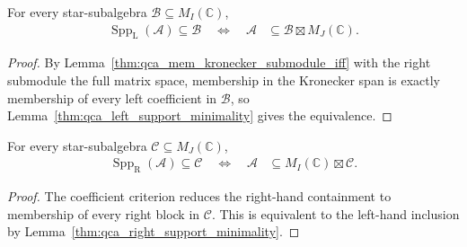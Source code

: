 \begin{lemma}
    \label{thm:qca_left_support_tensor_submodule}
    \leanok
    For every star-subalgebra $\mathcal B\subseteq M_I(\mathbb C)$,
    \begin{align}
        \operatorname{Spp}_{\mathrm L}(\mathcal A)\subseteq\mathcal B
        \quad\Longleftrightarrow\quad
        \mathcal A & \subseteq
        \mathcal B\boxtimes M_J(\mathbb C).
    \end{align}
\end{lemma}

\begin{proof}\leanok
    By Lemma~\ref{thm:qca_mem_kronecker_submodule_iff} with the right
    submodule the full matrix space, membership in the Kronecker span is
    exactly membership of every left coefficient in $\mathcal B$, so
    Lemma~\ref{thm:qca_left_support_minimality} gives the equivalence.
\end{proof}

\begin{lemma}
    \label{thm:qca_right_support_kronecker_submodule}
    \leanok
    For every star-subalgebra $\mathcal C\subseteq M_J(\mathbb C)$,
    \begin{align}
        \operatorname{Spp}_{\mathrm R}(\mathcal A)\subseteq\mathcal C
        \quad\Longleftrightarrow\quad
        \mathcal A & \subseteq M_I(\mathbb C)\boxtimes\mathcal C.
    \end{align}
\end{lemma}

\begin{proof}\leanok
    The coefficient criterion reduces the right-hand containment to membership
    of every right block in $\mathcal C$.  This is equivalent to the left-hand
    inclusion by Lemma~\ref{thm:qca_right_support_minimality}.
\end{proof}

